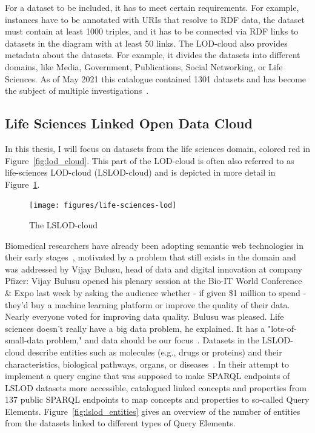 \documentclass[runningheads]{llncs}
\newenvironment{nbquote} {\quote\interlinepenalty=10000 } {\endquote}
\begin{document}
    For a dataset to be included, it has to meet certain requirements.
    For example, instances have to be annotated with URIs that resolve to RDF data, the dataset must contain at least 1000 triples, and it has to be connected via RDF links to datasets in the diagram with at least 50 links.
    The LOD-cloud also provides metadata about the datasets.
    For example, it divides the datasets into different domains, like Media, Government, Publications, Social Networking, or Life Sciences.
    As of May 2021 this catalogue contained 1301 datasets and has become the subject of multiple investigations~\citep{debattista2019lod, kamdar2019enabling, schmachtenberg2014adoption}.

    \subsection{Life Sciences Linked Open Data Cloud}
    In this thesis, I will focus on datasets from the life sciences domain, colored red in Figure~\ref{fig:lod_cloud}.
    This part of the LOD-cloud is often also referred to as life-sciences LOD-cloud (LSLOD-cloud) and is depicted in more detail in Figure~\ref{fig:lslod_cloud}.

    \begin{figure}[ht]
        \centering
        \texttt{[image: figures/life-sciences-lod]}
        \caption{The LSLOD-cloud\protect\footnotemark[\value{footnote}]}
        \label{fig:lslod_cloud}
    \end{figure}

    Biomedical researchers have already been adopting semantic web technologies in their early stages~\citep{ashburner2000gene, bodenreider2004unified, wang2005xml}, motivated by a problem that still exists in the domain and was addressed by Vijay Bulusu, head of data and digital innovation at company Pfizer:
    \begin{nbquote}
        Vijay Bulusu opened his plenary session at the Bio-IT World Conference \& Expo last week by asking the audience whether - if given \$1 million to spend - they'd buy a machine learning platform or improve the quality of their data.
        Nearly everyone voted for improving data quality.
        Bulusu was pleased.
        Life sciences doesn't really have a big data problem, he explained.
        It has a "lots-of-small-data problem," and data should be our focus~\citep{Pfizer}.
    \end{nbquote}
    Datasets in the LSLOD-cloud describe entities such as molecules (e.g., drugs or proteins) and their characteristics, biological pathways, organs, or diseases~\citep{bodenreider2008biomedical}.
    In their attempt to implement a query engine that was supposed to make SPARQL endpoints of LSLOD datasets more accessible, \citet{kamdar2014roadmap} catalogued linked concepts and properties from 137 public SPARQL endpoints to map concepts and properties to so-called Query Elements.
    Figure~\ref{fig:lslod_entities} gives an overview of the number of entities from the datasets linked to different types of Query Elements.
\end{document}

